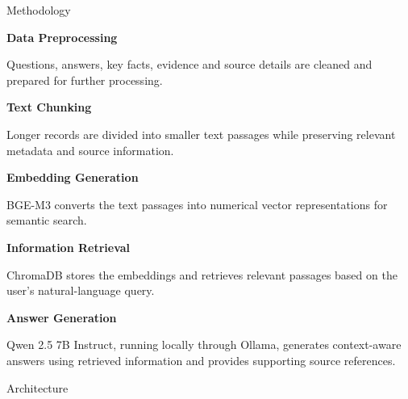 \documentclass[final]{article}
\newcommand{\methoditem}[1]{%
  \textcolor{KIWiOrange}{\large\textbullet}\hspace{2mm}%
  \textbf{\color{KIWiDark}#1}\\[-1mm]
  \ignorespaces
}
\begin{document}
\begin{minipage}[t][\dimexpr\textheight-10pt\relax][s]{\textwidth}
\begin{sectionbox}{Methodology}
\begin{minipage}[t]{0.485\textwidth}
  \methoditem{Data Preprocessing}
  Questions, answers, key facts, evidence and source details are cleaned
  and prepared for further processing.

  \methoditem{Text Chunking}
  Longer records are divided into smaller text passages while preserving
  relevant metadata and source information.
\end{minipage}
\hfill
\begin{minipage}[t]{0.485\textwidth}\vspace{0pt}
  \methoditem{Embedding Generation}
  BGE-M3 converts the text passages into numerical vector representations
  for semantic search.

  \methoditem{Information Retrieval}
  ChromaDB stores the embeddings and retrieves relevant passages based on
  the user's natural-language query.

  \methoditem{Answer Generation}
  Qwen 2.5 7B Instruct, running locally through Ollama, generates
  context-aware answers using retrieved information and provides
  supporting source references.
\end{minipage}
\end{sectionbox}

\vfill
\begin{sectionbox}{Architecture}
\centering
\vspace{2mm}
\end{sectionbox}
\end{minipage}
\end{document}
